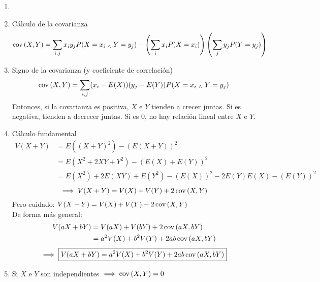 
\begin{obs}
	\begin{enumerate}
		\item[]
		\item Cálculo de la covarianza
		      \[\operatorname{cov}\left(X, Y\right) = \sum_{i,j}x_iy_jP(X=x_i \; _{\wedge} \; Y=y_j) - \left(\sum_{i} x_iP(X=x_i)\right)\left(\sum_{j} y_jP(Y=y_j)\right)\]
		\item Signo de la covarianza (y coeficiente de correlación)
		      \[\operatorname{cov}\left(X, Y\right) = \sum_{i,j}(x_i-E(X))(y_j-E(Y))P(X=x_i \; _{\wedge} \; Y=y_j)\]
		      Entonces, si la covarianza es positiva, $X$ e $Y$ tienden a crecer juntas. Si es negativa, tienden a decrecer juntas. Si es 0, no hay relación lineal entre $X$ e $Y$.
		      \begin{figure}[htbp]
			      
		      \end{figure}
		\item Cálculo fundamental
		      \begin{align*}
			      V(X+ Y) & = E((X+Y)^2)- (E(X+Y))^2                              \\
			              & = E(X^2+2XY+Y^2)- (E(X)+E(Y))^2                       \\
			              & = E(X^2)+2E(XY)+E(Y^2)- (E(X))^2-2E(Y)E(X) - (E(Y))^2
		      \end{align*}
		      \[\implies V(X+ Y) = V(X) + V(Y) + 2\operatorname{cov}\left(X, Y\right)\]
		      Pero cuidado: $V(X-Y)=V(X) + V(Y) -2\operatorname{cov}\left(X, Y\right)$ \\
		      De forma más general:
		      \begin{align*}
			      V(aX+ bY) & = V(aX) + V(bY) + 2\operatorname{cov}\left(aX, bY\right)       \\
			                & = a^2V(X) + b^2V(Y) + 2ab\operatorname{cov}\left(aX, bY\right)
		      \end{align*}
		      \[\implies \boxed{V(aX+ bY)=a^2V(X) + b^2V(Y) + 2ab\operatorname{cov}\left(aX, bY\right)}\]
		\item Si $X$ e $Y$ son independientes $\implies \operatorname{cov}\left(X, Y\right)=0$
	\end{enumerate}
\end{obs}

